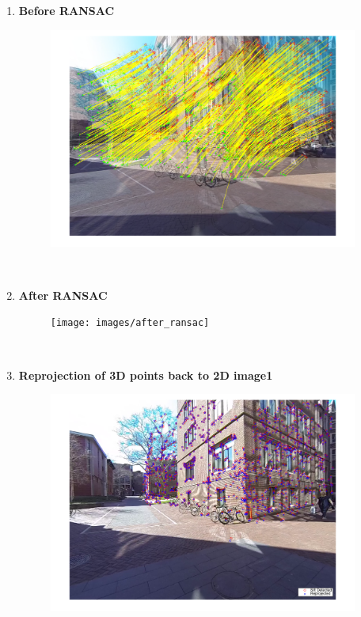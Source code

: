 \documentclass[10pt,letterpaper]{article}
\begin{document}
\begin{enumerate}[1]
\item \textbf{Before RANSAC}

\begin{figure}[h!]
 \center
  \includegraphics[width=4in]{images/before_ransac}
  \caption
   {}
\end{figure} \\

\item \textbf{After RANSAC}

\begin{figure}[h!]
 \center
  \texttt{[image: images/after\_ransac]}
  \caption
   {}
\end{figure} \\

\newpage

\item \textbf{Reprojection of 3D points back to 2D image1}

\begin{figure}[h!]
 \center
  \includegraphics[width=4in]{images/reprojection_image1}
  \caption
   {}
\end{figure} \\


\end{enumerate}
\end{document}
